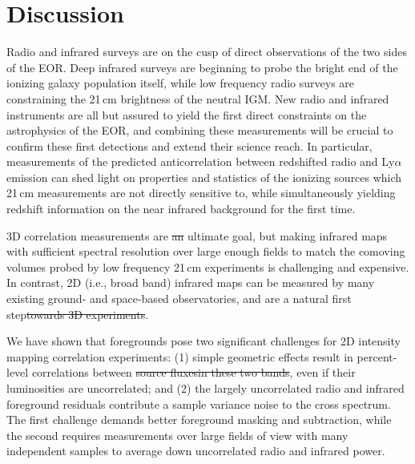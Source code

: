\documentclass[numberedappendix]{emulateapj}
\providecommand{\DIFadd}[1]{{\protect\color{blue}\uwave{#1}}} %
\providecommand{\DIFdel}[1]{{\protect\color{red}\sout{#1}}}                      %
\providecommand{\DIFaddbegin}{} %
\providecommand{\DIFaddend}{} %
\providecommand{\DIFdelbegin}{} %
\providecommand{\DIFdelend}{} %
\begin{document}
\section{Discussion}

Radio and infrared surveys are on the cusp of direct observations of the two sides of the EOR. Deep infrared surveys are beginning to probe the bright end of the ionizing galaxy population itself, while low frequency radio surveys are constraining the 21\,cm brightness of the neutral IGM. New radio and infrared instruments are all but assured to yield the first direct constraints on the astrophysics of the EOR, and combining these measurements will be crucial to confirm these first detections and extend their science reach. In particular, measurements of the predicted anticorrelation between redshifted radio and Ly$\alpha$ emission can shed light on properties and statistics of the ionizing sources which 21\,cm measurements are not directly sensitive to, while simultaneously yielding redshift information on the near infrared background for the first time. 

3D correlation measurements are \DIFdelbegin \DIFdel{an }\DIFdelend \DIFaddbegin \DIFadd{the }\DIFaddend ultimate goal, but making infrared maps with sufficient spectral resolution over large enough fields to match the comoving volumes probed by low frequency 21\,cm experiments is challenging and expensive. In contrast, 2D (i.e., broad band) infrared maps can be measured by many existing ground- and space-based observatories, and are a natural first step\DIFdelbegin \DIFdel{towards 3D experiments}\DIFdelend . 

We have shown that foregrounds pose two significant challenges for 2D intensity mapping correlation experiments: (1) simple geometric effects result in percent-level correlations between \DIFdelbegin \DIFdel{source fluxesin these two bands}\DIFdelend \DIFaddbegin \DIFadd{radio and infrared fluxes}\DIFaddend , even if their luminosities are uncorrelated; and (2) the largely uncorrelated radio and infrared foreground residuals contribute a sample variance noise to the cross spectrum. The first challenge demands better foreground masking and subtraction, while the second requires measurements over large fields of view with many independent samples to average down uncorrelated radio and infrared power.
\end{document}
